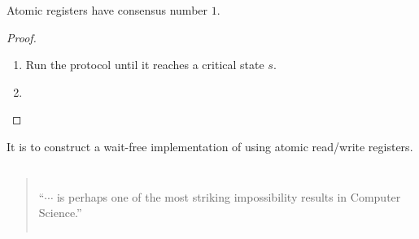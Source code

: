 \begin{frame}{}
\end{frame}

\begin{frame}{}
  \begin{theorem}
    Atomic registers have consensus number $1$.
  \end{theorem}

  \begin{proof}
    \begin{enumerate}[(1)]
      \item Run the protocol until it reaches a critical state $s$.
      \item {}
    \end{enumerate}
  \end{proof}
\end{frame}

\begin{frame}{}
\end{frame}

\begin{frame}{}
\end{frame}

\begin{frame}{}
\end{frame}

\begin{frame}{}
  \begin{theorem}
    It is  to construct a wait-free implementation of  using atomic read/write registers.
  \end{theorem}

  \pause
  \vspace{0.50cm}
  \begin{columns}
      \begin{quote}
	``$\cdots$ is perhaps one of the most striking impossibility results in Computer Science.''
      \end{quote}
  \end{columns}
\end{frame}
